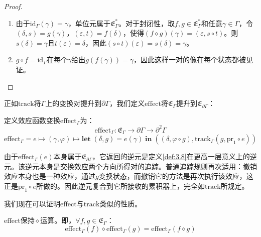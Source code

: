\begin{proof}
\begin{enumerate}
\item 由于$\mathrm{id}_\Gamma(\gamma) = \gamma$，单位元属于$\mathfrak{E}^*_\Gamma$。对于封闭性，取$f, g \in \mathfrak{E}^*_\Gamma$和任意$\gamma \in \Gamma$，令$(\delta, s) = g(\gamma)$，$(\varepsilon, t) = f(\delta)$，使得$(f \diamond g)(\gamma) = (\varepsilon, s \circ t)$。则$s(\delta) = \gamma$且$t(\varepsilon) = \delta$，因此$(s \circ t)(\varepsilon) = s(\delta) = \gamma$。
\item $g \circ f = \mathrm{id}_\Gamma$在每个$\gamma$给出$g(f(\gamma)) = \gamma$，因此这样一对的像在每个状态都被见证。
\end{enumerate}
\end{proof}

正如$\mathrm{track}$将$\Gamma$上的变换对提升到$\partial\Gamma$，我们定义$\mathrm{effect}$将$\mathfrak{E}_\Gamma$提升到$\mathfrak{E}_{\partial\Gamma}$：

\begin{definition}\label{def:3.12}
定义效应函数变换$\mathrm{effect}_\Gamma$为：
\begin{equation}\label{eq:3.14}
\mathrm{effect}_\Gamma : \mathfrak{E}_\Gamma \to \partial\Gamma \to \partial^2\Gamma
\end{equation}
\[
\mathrm{effect}_\Gamma = e \mapsto (\gamma, \varphi) \mapsto \mathbf{let}\;(\delta, g) = e(\gamma)\;\mathbf{in}\;((\delta, \varphi \circ g), \mathrm{track}_\Gamma(g, \mathrm{pr}_1 \circ e))
\]
\end{definition}

由于$\mathrm{effect}_\Gamma(e)$本身属于$\mathfrak{E}_{\partial\Gamma}$，它返回的逆元是定义\ref{def:3.8}在更高一层意义上的逆元。该逆元本身是交换效应两个方向所得对的追踪。普通追踪规则再次适用：撤销效应本身也是一种效应，通过$g$变换状态，而撤销它的方法是再次执行该效应，这正是$\mathrm{pr}_1 \circ e$所做的。因此逆元复合到它所接收的累积器上，完全如$\mathrm{track}$所规定。

我们现在可以证明$\mathrm{effect}$与$\mathrm{track}$类似的性质。

\begin{theorem}\label{thm:3.13}
$\mathrm{effect}$保持$\diamond$运算。即，$\forall f, g \in \mathfrak{E}_\Gamma$：
\begin{equation}\label{eq:3.15}
\mathrm{effect}_\Gamma(f) \diamond \mathrm{effect}_\Gamma(g) = \mathrm{effect}_\Gamma(f \diamond g)
\end{equation}
\end{theorem}

